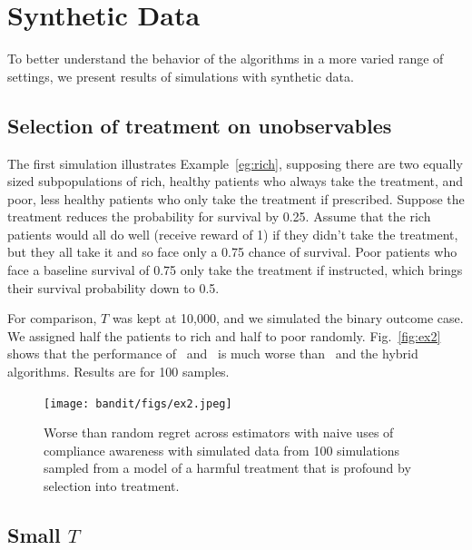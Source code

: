 \section{Synthetic Data}


To better understand the behavior of the algorithms in a more varied range of settings, we present results of simulations with synthetic data.



\subsection{Selection of treatment on unobservables}
The first simulation illustrates Example~\eqref{eg:rich}, supposing there are two equally sized subpopulations of rich, healthy patients who always take the treatment, and poor, less healthy patients who only take the treatment if prescribed. Suppose the treatment reduces the probability for survival by 0.25. Assume that the rich patients would all do well (receive reward of 1) if they didn't take the treatment, but they all take it and so face only a 0.75 chance of survival. Poor patients who face a baseline survival of 0.75 only take the treatment if instructed, which brings their survival probability down to 0.5.

For comparison, $T$ was kept at 10,000, and we simulated the binary outcome case. We assigned half the patients to rich and half to poor randomly. Fig.~\eqref{fig:ex2} shows that the performance of \actual\, and \comply\, is much worse than \chosen\, and the hybrid algorithms. Results are for 100 samples.
%

%


\begin{figure}
	\centering	
	\texttt{[image: bandit/figs/ex2.jpeg]}\hspace{1cm}
	\label{fig:ex2}
	\caption{Worse than random regret across estimators with naive uses of compliance awareness with simulated data from 100 simulations sampled from a model of a harmful treatment that is profound by selection into treatment.}
\end{figure}



\subsection{Small $T$}

